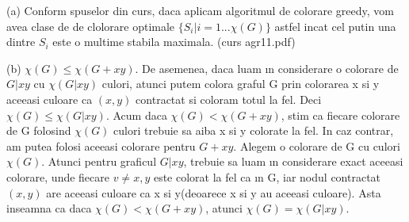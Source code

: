 \documentclass{article}
\begin{document}
(a)
 Conform spuselor din curs, daca aplicam algoritmul de colorare greedy, vom avea clase de de clolorare optimale $\{S_i | i=1...\chi(G)\}$  astfel incat cel putin una dintre $S_i$ este o multime stabila maximala. (curs agr11.pdf) 

(b) $\chi(G) ≤ \chi(G + xy)$. De asemenea, daca luam ın considerare o colorare
de $G|xy$ cu $\chi(G|xy)$ culori, atunci putem colora graful G prin colorarea x si y
aceeasi culoare ca $(x, y)$ contractat si coloram totul la fel. Deci $\chi(G) ≤ \chi(G|xy)$.
Acum daca $\chi(G) < \chi(G + xy)$, stim ca fiecare colorare de G folosind $\chi(G)$
culori trebuie sa aiba x si y colorate la fel. In caz contrar, am putea folosi aceeasi
colorare pentru $G + xy$.
Alegem o colorare de G cu culori $\chi(G)$. Atunci pentru graficul $G|xy$, trebuie
sa luam ın considerare exact aceeasi colorare, unde fiecare $v \neq x, y$ este colorat
la fel ca ın G, iar nodul contractat $(x, y)$ are aceeasi culoare ca x si
y(deoarece x si y au aceeasi culoare).
Asta inseamna ca daca $\chi(G) < \chi(G + xy)$, atunci $\chi(G) = \chi(G|xy)$.
\end{document}
